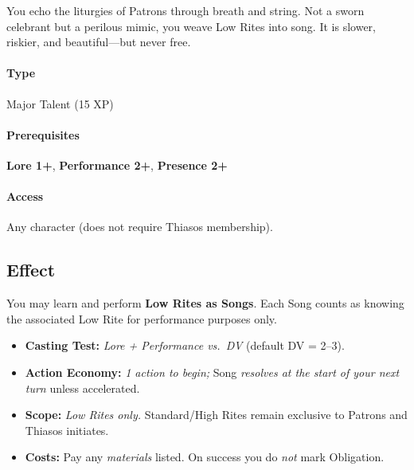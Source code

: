 \begin{tcolorbox}[colback=black!3,colframe=black!40!white,title={Cantor's Path}]
You echo the liturgies of Patrons through breath and string. Not a sworn celebrant but a perilous mimic, you weave Low Rites into song. It is slower, riskier, and beautiful---but never free.
\end{tcolorbox}

\paragraph*{Type} Major Talent (15 XP) \quad
\paragraph*{Prerequisites} \textbf{Lore 1+}, \textbf{Performance 2+}, \textbf{Presence 2+} \quad
\paragraph*{Access} Any character (does not require Thiasos membership).

\subsection*{Effect}
You may learn and perform \textbf{Low Rites as Songs}. Each Song counts as knowing the associated Low Rite for performance purposes only.

\begin{itemize}
  \item \textbf{Casting Test:} \emph{Lore + Performance vs.\ DV} (default DV = 2--3).
  \item \textbf{Action Economy:} \emph{1 action to begin;} Song \emph{resolves at the start of your next turn} unless accelerated.
  \item \textbf{Scope:} \emph{Low Rites only.} Standard/High Rites remain exclusive to Patrons and Thiasos initiates.
  \item \textbf{Costs:} Pay any \emph{materials} listed. On success you do \emph{not} mark Obligation.
\end{itemize}

